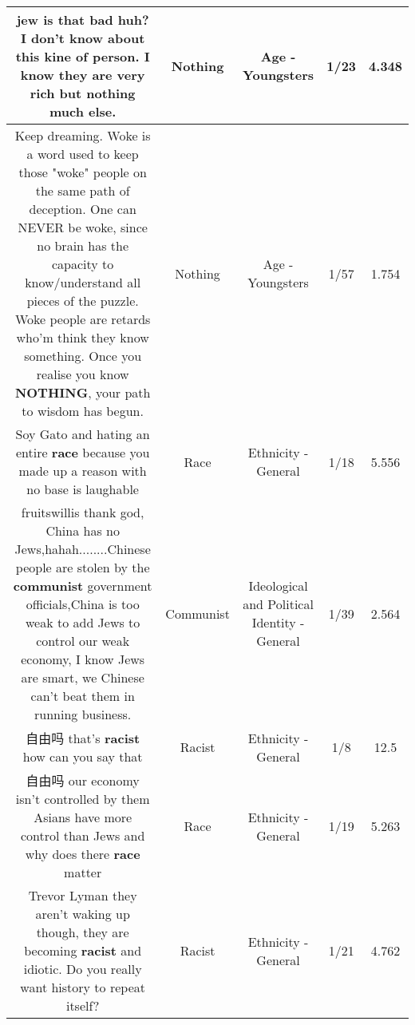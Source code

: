 \documentclass[11pt]{article}
\newlength\mylength
\begin{document}
\begin{center}
\begin{longtable}{|C{.65\mylength}|C{.30\mylength}|C{.12\mylength}|C{.12\mylength}|C{.12\mylength}|}
  \small jew is that bad huh? I don't know about this kine of person. I know they are very rich but \textbf{nothing} much else.\normalsize   & Nothing & Age - Youngsters & 1/23 & 4.348 \\  \hline
  \small Keep dreaming. Woke is a word used to keep those "woke" people on the same path of deception.  One can NEVER be woke, since no brain has the capacity to know/understand all pieces of the puzzle. Woke people are retards who'm think they know something. Once you realise you know \textbf{NOTHING}, your path to wisdom has begun.\normalsize   & Nothing & Age - Youngsters & 1/57 & 1.754 \\  \hline
  \small Soy Gato and hating an entire \textbf{race} because you made up a reason with no base is laughable\normalsize   & Race & Ethnicity - General & 1/18 & 5.556 \\  \hline
  \small fruitswillis thank god, China has no Jews,hahah........Chinese people are stolen by the \textbf{communist} government officials,China is too weak to add Jews to control our weak economy, I know Jews are smart, we Chinese can't beat them in running business.\normalsize   & Communist &  Ideological and Political Identity - General & 1/39 & 2.564 \\  \hline
  \small 自由吗 that's \textbf{racist} how can you say that\normalsize   & Racist & Ethnicity - General & 1/8 & 12.5 \\  \hline
  \small 自由吗 our economy isn't controlled by them Asians have more control than Jews and why does there \textbf{race} matter\normalsize   & Race & Ethnicity - General & 1/19 & 5.263 \\  \hline
  \small Trevor Lyman they aren't waking up though, they are becoming \textbf{racist} and idiotic. Do you really want history to repeat itself?\normalsize   & Racist & Ethnicity - General & 1/21 & 4.762 \\  \hline

\end{longtable}
\end{center}
\end{document}
